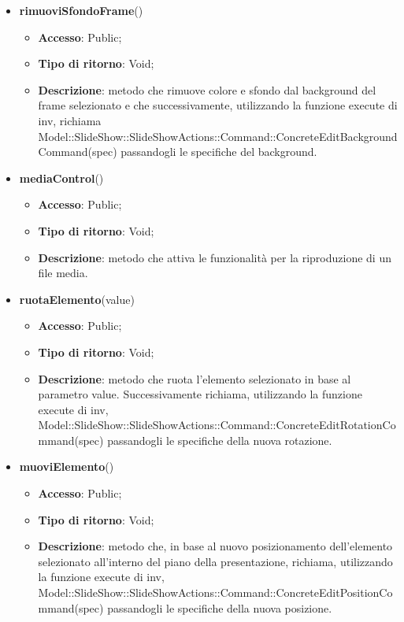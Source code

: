 {{\begin{itemize}
\begin{itemize}
		\end{itemize}
		\item \textbf{rimuoviSfondoFrame}()
		\begin{itemize}
			\item \textbf{Accesso}: Public;
			\item \textbf{Tipo di ritorno}: Void;
			\item \textbf{Descrizione}: metodo che rimuove colore e sfondo dal background del frame selezionato e che successivamente, utilizzando la funzione execute di inv, richiama Model::\-SlideShow::\-SlideShowActions::\-Command::\-ConcreteEditBackgroundCommand(spec) passandogli le specifiche del background.
		\end{itemize}
		\item \textbf{mediaControl}()
		\begin{itemize}
			\item \textbf{Accesso}: Public;
			\item \textbf{Tipo di ritorno}: Void;
			\item \textbf{Descrizione}: metodo che attiva le funzionalità per la riproduzione di un file media.
		\end{itemize}
		\item \textbf{ruotaElemento}(value)
		\begin{itemize}
			\item \textbf{Accesso}: Public;
			\item \textbf{Tipo di ritorno}: Void;
			\item \textbf{Descrizione}: metodo che ruota l'elemento selezionato in base al parametro value. Successivamente richiama, utilizzando la funzione execute di inv, Model::\-SlideShow::\-SlideShowActions::\-Command::\-ConcreteEditRotationCommand(spec) passandogli le specifiche della nuova rotazione.
		\end{itemize}
		\item \textbf{muoviElemento}()
		\begin{itemize}
			\item \textbf{Accesso}: Public;
			\item \textbf{Tipo di ritorno}: Void;
			\item \textbf{Descrizione}: metodo che, in base al nuovo posizionamento dell'elemento selezionato all'interno del piano della presentazione, richiama, utilizzando la funzione execute di inv, Model::\-SlideShow::\-SlideShowActions::\-Command::\-ConcreteEditPositionCommand(spec) passandogli le specifiche della nuova posizione.
		\end{itemize}

\end{itemize}}}
